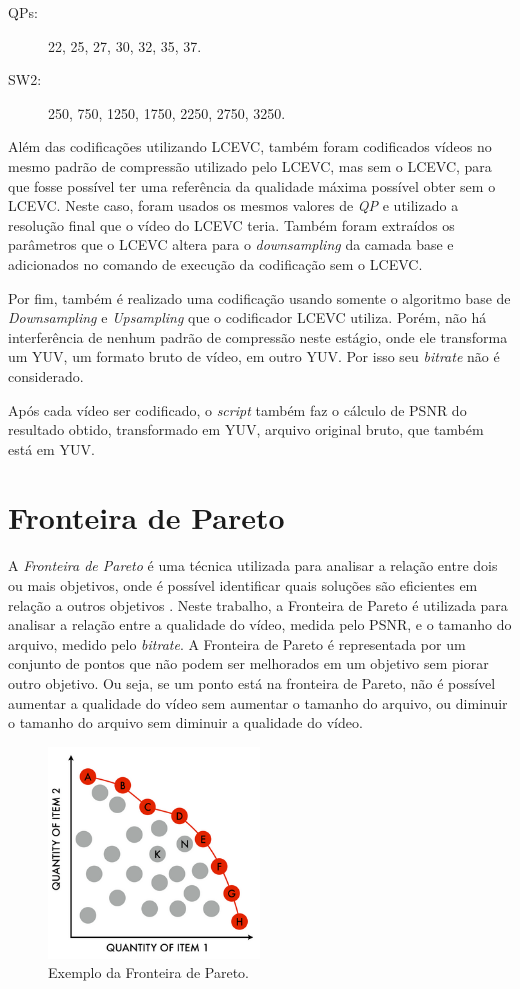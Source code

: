 \begin{description}
\item[QPs:] 22, 25, 27, 30, 32, 35, 37.
\item[SW2:] 250, 750, 1250, 1750, 2250, 2750, 3250.
\end{description}

Além das codificações utilizando \acrshort{LCEVC}, também foram codificados vídeos no mesmo
padrão de compressão utilizado pelo \acrshort{LCEVC}, mas sem o \acrshort{LCEVC}, para que fosse possível 
ter uma referência da qualidade máxima possível obter sem o \acrshort{LCEVC}. Neste caso, foram usados
os mesmos valores de \textit{QP} e utilizado a resolução final que o vídeo do \acrshort{LCEVC} teria.
Também foram extraídos os parâmetros que o LCEVC altera para o \textit{downsampling} da camada
base e adicionados no comando de execução da codificação sem o \acrshort{LCEVC}.
 
Por fim, também é realizado uma codificação usando somente o algoritmo base de \textit{Downsampling}
e \textit{Upsampling} que o codificador \acrshort{LCEVC} utiliza. Porém, não há interferência de nenhum padrão
de compressão neste estágio, onde ele transforma um YUV, um formato bruto de vídeo, em outro YUV. Por isso
seu \textit{bitrate} não é considerado.

Após cada vídeo ser codificado, o \textit{script} também faz o cálculo de \acrfull{PSNR} do resultado obtido,
transformado em YUV, arquivo original bruto, que também está em YUV.

\section{Fronteira de Pareto}

A \textit{Fronteira de Pareto} é uma técnica utilizada para analisar a relação entre dois ou mais
objetivos, onde é possível identificar quais soluções são eficientes em relação a
outros objetivos \cite{pareto_definition}. Neste trabalho, a Fronteira de Pareto é utilizada para analisar a relação
entre a qualidade do vídeo, medida pelo \acrshort{PSNR}, e o tamanho do arquivo, medido pelo \textit{bitrate}.
A Fronteira de Pareto é representada por um conjunto de pontos que não podem ser melhorados em um
objetivo sem piorar outro objetivo. Ou seja, se um ponto está na fronteira de Pareto, não é possível
aumentar a qualidade do vídeo sem aumentar o tamanho do arquivo, ou diminuir o tamanho do arquivo sem
diminuir a qualidade do vídeo.

\begin{figure}[h]
    \centering
    \includegraphics[width=0.5\textwidth]{img/pareto-2.png}
    \caption{Exemplo da Fronteira de Pareto. \cite{pareto_img}}
    \label{fig:pareto}
\end{figure}